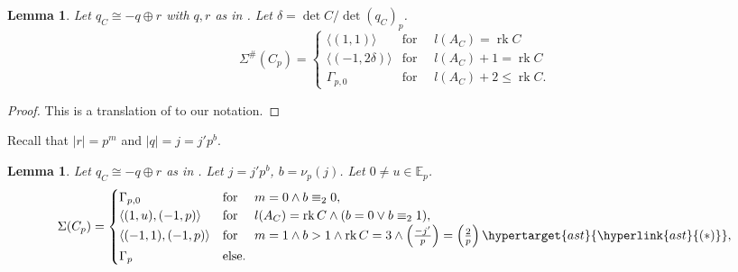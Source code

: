 \documentclass{amsart}
\theoremstyle{definition}
\theoremstyle{plain}
\newtheorem{lemma}[definition]{Lemma}
\DeclareMathOperator{\rk}{rk}
\newcommand{\EE}{\mathbb{E}}
\newcommand{\condAst}{\hyperlink{ast}{(\ast)}}
\begin{document}
\begin{lemma}\label{lem:SCp-sharp}
Let $q_C \cong -q \oplus r$ with $q,r$ as in .
 Let $\delta = \det C / \det (q_C)_p$.
  \begin{equation}\label{eqn:SCp_sharp}
\Sigma^\#(C_p)=
\begin{cases}
\langle (1,1)\rangle & \mbox{for } \quad l(A_C) = \rk C\\
\langle (-1,2\delta )\rangle& \mbox{for }\quad  l(A_C) + 1 = \rk C\\
\Gamma_{p,0}& \mbox{for } \quad l(A_C) + 2 \leq \rk C.
\end{cases}
 \end{equation}
 \end{lemma}
\begin{proof}
This is a translation of
\cite[VII Thm.\ 12.1]{miranda_morrison:embeddings}
to our notation.
\end{proof}
Recall that $|r|=p^m$ and $|q|=j= j'p^b$.
\begin{lemma}\label{lem:SCp}
Let $q_C \cong -q \oplus r$ as in . Let $j=j' p^b$, $b=\nu_p(j)$.
Let $0 \neq u \in \EE_p$.
 \[\Sigma(C_p) = \begin{cases}
    \Gamma_{p,0} &\mbox{for }\quad m=0 \wedge b \equiv_2 0,\\
  \langle (1,u),(-1,p)\rangle &\mbox{for }\quad l(A_C)=\rk C \wedge(b=0 \vee  b \equiv_2 1),\\
  \langle (-1,1),(-1,p)\rangle  &\mbox{for }\quad m=1 \wedge b>1 \wedge \rk C=3 \wedge \left( \frac{-j'}{p}\right)=\left(\frac{2}{p}\right) \hypertarget{ast}{\condAst},\\
  \Gamma_p &\mbox{else.}
    \end{cases}\]
\end{lemma}
\end{document}
